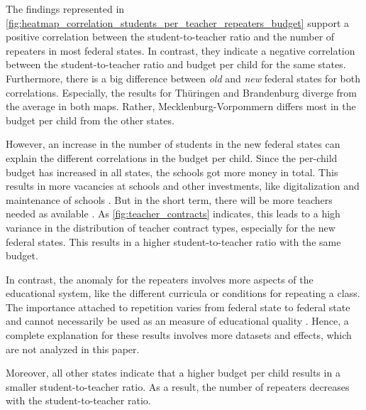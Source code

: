 The findings represented in \autoref{fig:heatmap_correlation_students_per_teacher_repeaters_budget} support a  positive correlation between the student-to-teacher ratio and the number of repeaters in most federal states. 
In contrast, they indicate a negative correlation between the student-to-teacher ratio  and budget per child for the same states. Furthermore, there is a big difference between \emph{old} and \emph{new} federal states for both correlations. Especially, the results for Thüringen and Brandenburg diverge from the average in both maps. Rather, Mecklenburg-Vorpommern differs most in the budget per child from the other states.

However,  an increase in the number of students in the new federal states can explain the different correlations in the budget per child. Since the per-child budget has increased in all states, the schools got more money in total. This results in more vacancies at schools \cite{kultusminister_konferenz_lehrkrafteeinstellungsbedarf_2023} and other investments, like digitalization and maintenance of schools \cite{bundesministerium_fur_bildung_und_forschung_fortschrittsbericht_2022}. But in the short term, there will be more teachers needed as available \cite{kultusminister_konferenz_lehrkrafteeinstellungsbedarf_2023}. As \autoref{fig:teacher_contracts} indicates, this leads to a high variance in the distribution of teacher contract types, especially for the new federal states. This results in a higher student-to-teacher ratio with the same budget.

In contrast, the anomaly for the repeaters involves more aspects of the educational system, like the different curricula or conditions for repeating a class. The importance attached to repetition varies from federal state to federal state and cannot necessarily be used as an measure of educational quality \cite{klemm_klassenwiederholungen_2009}. Hence, a complete explanation for these results involves more datasets and effects, which are not analyzed in this paper.

Moreover, all other states indicate that a higher budget per child results in a smaller student-to-teacher ratio. As a result, the number of repeaters decreases with the student-to-teacher ratio.